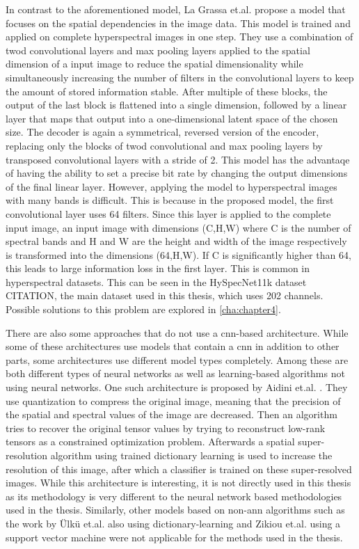 In contrast to the aforementioned model, La Grassa et.al. \citep{la_grassa_hyperspectral_2022} propose a model that focuses on the spatial dependencies in the image data. This model is trained and applied on complete hyperspectral images in one step. They use a combination of \ac{twod} convolutional layers and max pooling layers applied to the spatial dimension of a input image to reduce the spatial dimensionality while simultaneously increasing the number of filters in the convolutional layers to keep the amount of stored information stable. After multiple of these blocks, the output of the last block is flattened into a single dimension, followed by a linear layer that maps that output into a one-dimensional latent space of the chosen size. The decoder is again a symmetrical, reversed version of the encoder, replacing only the blocks of \ac{twod} convolutional and max pooling layers by transposed convolutional layers with a stride of 2. This model has the advantaqe of having the ability to set a precise bit rate by changing the output dimensions of the final linear layer. However, applying the model to hyperspectral images with many bands is difficult. This is because in the proposed model, the first convolutional layer uses 64 filters. Since this layer is applied to the complete input image, an input image with dimensions (C,H,W) where C is the number of spectral bands and H and W are the height and width of the image respectively is transformed into the dimensions (64,H,W). If C is significantly higher than 64, this leads to large information loss in the first layer. This is common in hyperspectral datasets. This can be seen in the HySpecNet11k dataset CITATION, the main dataset used in this thesis, which uses 202 channels. Possible solutions to this problem are explored in \autoref{cha:chapter4}.

There are also some approaches that do not use a \ac{cnn}-based architecture. While some of these architectures use models that contain a \ac{cnn} in addition to other parts, some architectures use different model types completely. Among these are both different types of neural networks as well as learning-based algorithms not using neural networks.
One such architecture is proposed by Aidini et.al. \citep{aidini_hyperspectral_2019}. They use quantization to compress the original image, meaning that the precision of the spatial and spectral values of the image are decreased. Then an algorithm tries to recover the original tensor values by trying to reconstruct low-rank tensors as a constrained optimization problem. Afterwards a spatial super-resolution algorithm using trained dictionary learning is used to increase the resolution of this image, after which a classifier is trained on these super-resolved images. While this architecture is interesting, it is not directly used in this thesis as its methodology is very different to the neural network based methodologies used in the thesis.
Similarly, other models based on non-\ac{ann} algorithms such as the work by Ülkü et.al. \citep{ulku_large-scale_2018} also using dictionary-learning and Zikiou et.al. \citep{zikiou_support_2020} using a support vector machine were not applicable for the methods used in the thesis.

